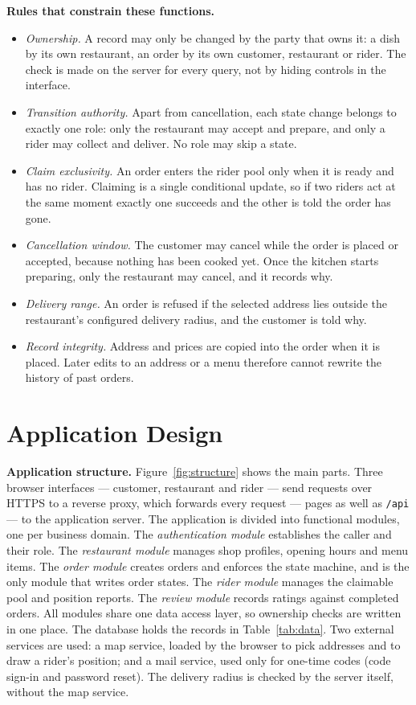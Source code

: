 \noindent\textbf{Rules that constrain these functions.}
\begin{itemize}
\item \emph{Ownership.} A record may only be changed by the party that owns it: a dish by its
own restaurant, an order by its own customer, restaurant or rider. The check is made on the
server for every query, not by hiding controls in the interface.
\item \emph{Transition authority.} Apart from cancellation, each state change belongs to exactly one
role: only the restaurant may accept and prepare, and only a rider may collect and deliver. No role may skip a
state.
\item \emph{Claim exclusivity.} An order enters the rider pool only when it is ready and has no
rider. Claiming is a single conditional update, so if two riders act at the same moment exactly
one succeeds and the other is told the order has gone.
\item \emph{Cancellation window.} The customer may cancel while the order is placed or accepted,
because nothing has been cooked yet. Once the kitchen starts preparing, only the restaurant may
cancel, and it records why.
\item \emph{Delivery range.} An order is refused if the selected address lies outside the
restaurant's configured delivery radius, and the customer is told why.
\item \emph{Record integrity.} Address and prices are copied into the order when it is placed.
Later edits to an address or a menu therefore cannot rewrite the history of past orders.
\end{itemize}

\section{Application Design}

\noindent\textbf{Application structure.} Figure~\ref{fig:structure} shows the main parts.
Three browser interfaces --- customer, restaurant and rider --- send requests over HTTPS to a
reverse proxy, which forwards every request --- pages as well as \texttt{/api} --- to the
application server. The
application is divided into functional modules, one per business domain. The
\emph{authentication module} establishes the caller and their role.
The \emph{restaurant module} manages shop profiles, opening hours and menu items. The
\emph{order module} creates orders and enforces the state machine, and is the only module that
writes order states. The \emph{rider module} manages the claimable pool and position reports.
The \emph{review module} records ratings against completed orders. All modules share one data
access layer, so ownership checks are written in one place. The database holds the records in Table~\ref{tab:data}. Two external
services are used: a map service, loaded by the browser to pick addresses and to draw a rider's
position; and a mail service, used only for one-time codes (code sign-in and password reset). The
delivery radius is checked by the server itself, without the map service.

